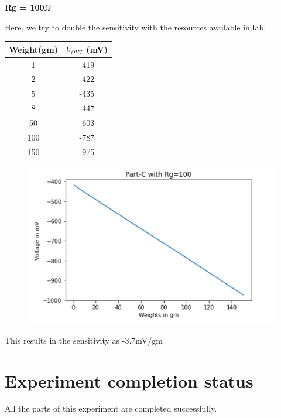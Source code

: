 \documentclass[12pt]{article}
\begin{document}
\begin{center}
\textbf{Rg = 100$\Omega $}
\end{center}
\begin{center}
Here, we try to double the sensitivity with the resources available in lab.
\begin{table}[H]
		\begin{center}
		
		\begin{tabular}{|c|c|}
			\hline
			\textbf{Weight(gm)} & \textbf{$V_{OUT}$ (mV)}\\
			\hline
			1 & -419\\
			\hline
			2 & -422\\
			\hline
                   5 & -435\\
			\hline
                   8 & -447\\
			\hline
50 & -603\\
			\hline
100 & -787\\
			\hline
150 & -975\\
			\hline
            
		\end{tabular}
		\end{center}
\end{table}
\end{center}
\begin{figure}[H]
\begin{center}
\includegraphics[scale = 1]{cii.PNG}
\end{center}
\end{figure}
This results in the sensitivity as -3.7mV/gm\\





\section{Experiment completion status}
All the parts of this experiment are completed successfully.

  
\end{document}
